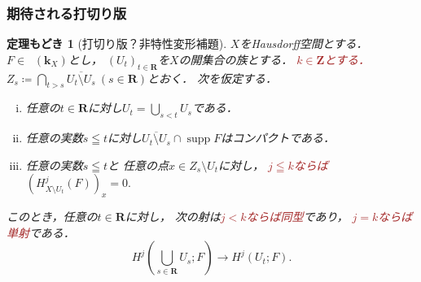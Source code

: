 \documentclass[dvipdfmx,10pt,aspectratio=169,leqno]{beamer}%
\newcommand{\zz}{\mathbf{Z}}
\newcommand{\rr}{\mathbf{R}}
\newcommand{\kk}{\mathbf{k}}
\numberwithin{equation}{subsection}
\newcommand{\supp}{\mathop{\mathrm{supp}}\nolimits}
\newcommand{\Dompl}{\mathop{\mathsf{D}^\mathrm{+}}\nolimits}
\theoremstyle{mystyle}
\newtheorem{HM}[AXM]{定理もどき}
\begin{document}
\begin{frame}
    \frametitle{期待される打切り版}
  \begin{HM}[打切り版？非特性変形補題]
    \(X\)をHausdorff空間とする．
    \(F\in\Dompl(\kk_X)\)とし，
    \(\left(U_{t}\right)_{t\in\rr}\)を\(X\)の開集合の族とする．
    \textcolor{brown}{\(k\in\zz\)とする．}
    \(
      Z_{s}\coloneqq \bigcap_{t>s}\overline{U_t\setminus U_s}\ (s\in\rr)
    \)とおく．
    次を仮定する．%
    \begin{enumerate}[(i)]
      \setlength{\leftskip}{10pt}
      \item \label{item:t-nonchar1}
      任意の\(t\in\rr\)に対し\(U_{t}=\bigcup_{s<t}U_{s}\)である．
      \item \label{item:t-nonchar2}
      任意の実数\(s\leqq t\)に対し\(
        \overline{U_{t}\setminus U_{s}}\cap \supp{F}
      \)はコンパクトである．
      \item \label{item:t-nonchar3}
      任意の実数\(s\leqq t\)と
      任意の点\(x\in Z_{s}\setminus U_{t}\)に対し，
      \textcolor{brown}{\(j\leqq k\)ならば}
      \(
        (H^{j}_{X\setminus U_{t}}(F))_{x}=0. 
      \)
    \end{enumerate}
    このとき，任意の\(t\in\rr\)に対し，
    次の射は\textcolor{brown}{\(j<k\)ならば同型}であり，
    \textcolor{brown}{\(j=k\)ならば単射}である．
    \[
      H^{j}\left(\bigcup_{s\in\rr}U_{s};F\right)
      \to
      H^{j}\left(U_{t};F\right).
    \]
  \end{HM}
\end{frame}
\end{document}
